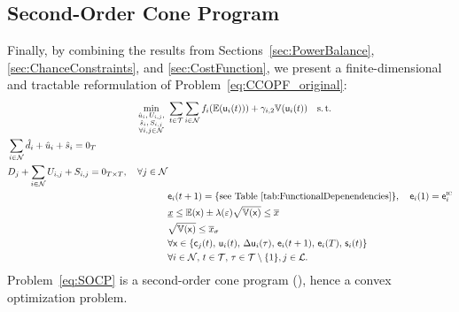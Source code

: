 \documentclass[final,3p,times,twocolumn]{elsarticle}  %
\begin{document}
\subsection{Second-Order Cone Program}

Finally, by combining the results from Sections~\ref{sec:PowerBalance}, \ref{sec:ChanceConstraints}, and \ref{sec:CostFunction}, we present a finite-dimensional and tractable reformulation of Problem~\eqref{eq:CCOPF_original}:
\begin{subequations} 
	\label{eq:SOCP}
	\begin{align}
	\underset{\substack{\hat\gen_i,\, \Gen_{i,j}, \\ \hat\storage_i,\, \Storage_{i,j} \\
	\forall i,j \in \mathcal{\nbus}}}{\operatorname{min}}~  & \sum_{t \in \mathcal{\horizon}}\sum_{i \in \mathcal{\nbus}} f_i(\ev{\rv\gen_i(t)}) +  \gamma_{i,2}\var{\rv\gen_i(t)}  \quad \mathrm{s.\,t.} \\
	\begin{split}
		&\sum_{i \in \mathcal{\nbus}} \hat\load_i + \hat\gen_i + \hat\storage_i = 0_{\horizon}\\
		&\Load_j + \sum_{i \in \mathcal{\nbus}} \Gen_{i,j} + \Storage_{i,j} = 0_{\horizon \times \horizon}, \quad  \forall j \in \mathcal{\nbus}
	\end{split} \\
	& \rv\energy_i(t+1) = \text{\{see Table \ref{tab:FunctionalDepenendencies}\}}, \quad \rv\energy_i(1) = \rv\energy_i^{\text{\textsc{ic}}} \\
	& \underline{x} \leq \ev{\rv{x}} \pm \lambda(\varepsilon) \sqrt{\var{\rv{x}}} \leq \overline{x} \\
	& \sqrt{\var{\rv{x}}} \leq \overline{x}_{\sigma} \\
	\nonumber
	& \forall \rv{x} \in \{ \rv\lineflow_j(t), \, \rv\gen_i(t), \, \Delta\rv\gen_i(\tau), \, \rv\energy_i(t+1), \,\rv\energy_i(\horizon),\, \rv\storage_i(t) \} \\
	\nonumber
	& \forall i \in \mathcal{\nbus}, \, t \in \mathcal{\horizon}, \, \tau \in \mathcal{\horizon} \setminus \{1\}, j \in \mathcal{L}.
	\end{align}
\end{subequations}
Problem~\eqref{eq:SOCP} is a second-order cone program (\socp), hence a convex optimization problem. 
\end{document}
